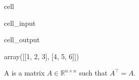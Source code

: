 \documentclass[letterpaper,10pt,english]{jupyterBook}
\begin{document}
\begin{sphinxuseclass}{cell}\begin{sphinxVerbatimInput}

\begin{sphinxuseclass}{cell_input}
\begin{sphinxVerbatim}[commandchars=\\\{\}]
\end{sphinxVerbatim}

\end{sphinxuseclass}\end{sphinxVerbatimInput}
\begin{sphinxVerbatimOutput}

\begin{sphinxuseclass}{cell_output}
\begin{sphinxVerbatim}[commandchars=\\\{\}]
array([[1, 2, 3],
       [4, 5, 6]])
\end{sphinxVerbatim}

\end{sphinxuseclass}\end{sphinxVerbatimOutput}

\end{sphinxuseclass}
\sphinxAtStartPar
A  is a matrix \(A\in\mathbb{R}^{n\times n}\) such that \(A^\top = A\).
\end{document}
